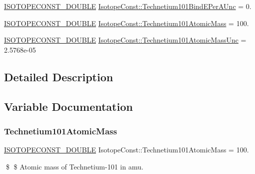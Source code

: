 \begin{DoxyCompactItemize}
\item 
\mbox{\hyperlink{group___isotope_const-_macros_ga8f45a7272ce02c0b4c65c44636ed719a}{I\+S\+O\+T\+O\+P\+E\+C\+O\+N\+S\+T\+\_\+\+D\+O\+U\+B\+LE}} \mbox{\hyperlink{group___isotope_const-_technetium-_tc101_ga7d20104635f1580b55751163f744df41}{Isotope\+Const\+::\+Technetium101\+Bind\+E\+Per\+A\+Unc}} = 0.
\item 
\mbox{\hyperlink{group___isotope_const-_macros_ga8f45a7272ce02c0b4c65c44636ed719a}{I\+S\+O\+T\+O\+P\+E\+C\+O\+N\+S\+T\+\_\+\+D\+O\+U\+B\+LE}} \mbox{\hyperlink{group___isotope_const-_technetium-_tc101_ga81f4554bc97829fb54c3e6729c318705}{Isotope\+Const\+::\+Technetium101\+Atomic\+Mass}} = 100.
\item 
\mbox{\hyperlink{group___isotope_const-_macros_ga8f45a7272ce02c0b4c65c44636ed719a}{I\+S\+O\+T\+O\+P\+E\+C\+O\+N\+S\+T\+\_\+\+D\+O\+U\+B\+LE}} \mbox{\hyperlink{group___isotope_const-_technetium-_tc101_gabe6e9a8c177a13b4c5131edcf86bd515}{Isotope\+Const\+::\+Technetium101\+Atomic\+Mass\+Unc}} = 2.\+5768e-\/05
\end{DoxyCompactItemize}


\subsection{Detailed Description}


\subsection{Variable Documentation}
\mbox{\label{group___isotope_const-_technetium-_tc101_ga81f4554bc97829fb54c3e6729c318705}} 
\subsubsection{\texorpdfstring{Technetium101\+Atomic\+Mass}{Technetium101AtomicMass}}
{\footnotesize\ttfamily \mbox{\hyperlink{group___isotope_const-_macros_ga8f45a7272ce02c0b4c65c44636ed719a}{I\+S\+O\+T\+O\+P\+E\+C\+O\+N\+S\+T\+\_\+\+D\+O\+U\+B\+LE}} Isotope\+Const\+::\+Technetium101\+Atomic\+Mass = 100.}

\$ \$ Atomic mass of Technetium-\/101 in amu. \mbox{\label{group___isotope_const-_technetium-_tc101_gabe6e9a8c177a13b4c5131edcf86bd515}} 
